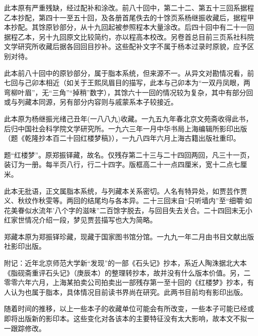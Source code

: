 此本原有严重残缺，经过配补和涂改。前八十回中，第二十二、第五十三回系据程乙本抄配，第四十一至五十回，及各册首尾佚去的十馀页系杨继振收藏后，据程甲本抄配。其馀原钞部分，从十九回起被参照程本大量涂改。后四十回中有二十一回据程乙本，另十九回原文比较简约，亦以程高本校改。另卷首总目前三页系社科院文学研究所收藏后据各回回目抄补。这些配补文字不属于杨本过录时原貌，应予区别对待。

此本前八十回中的原钞部分，属于脂本系统，但来源不一。从异文对勘情况看，前七回与己卯本相近（如关于王熙凤眉目的描写，此本与己卯本为“一双丹凤眼，两弯柳叶眉”，无“三角”“掉稍”数字），其馀六十一回的情况较为复杂，其中有部分回或与列藏本同源，另有部分内容则与戚蒙系本子较接近。

此本原为杨继振光绪己丑年(一八八九)收藏。一九五九年春北京文苑斋收得此书，后归中国社会科学院文学研究所。一九六三年一月中华书局上海编辑所影印出版（题《乾隆抄本百二十回红楼梦稿》），一九八四年六月上海古籍出版社重印。

{}

题“红楼梦”。原郑振铎藏，故名。仅残存第二十三与二十四回两回，凡三十一页，装订为一册。每半页八行，行二十四字。版框高二十一点四厘米，宽十二点七厘米。

此本无批语，正文属脂本系统，与列藏本关系密切。人名有特异处，如贾芸作贾义、秋纹作秋雯等。两回的结尾均与各本异。二十三回末自“只听墙内”至“细嚼‘如花美眷似水流年’八个字的滋味”二百馀字脱去，与回目失去关合。二十四回末无小红家世情况介绍一段，梦见贾芸描写也大为简略。

郑藏本原为郑振铎珍藏，现藏于国家图书馆分馆。一九九一年二月由书目文献出版社影印出版。

附记：近年北京师范大学新“发现”的一部《石头记》抄本，系近人陶洙据北大本《脂砚斋重评石头记》（庚辰本）的整理转抄本，故并没有什么版本价值。另，二零零六年六月，上海某拍卖公司拍卖出一部残存第一至十回的《红楼梦》抄本，有人认为也属于脂本，具体情况目前读书界尚在研究。此两书目前均有影印出版。

随着时间的推移，以上一些本子的收藏单位可能会有所改变，一些本子可能已经或即将出版新的影印本。这些变化对各该本的主要特征没有太大影响，故本文不拟一一跟踪修改。
